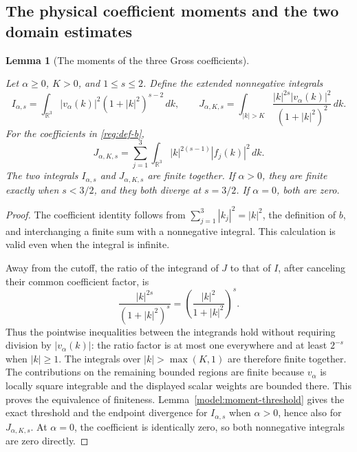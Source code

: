 \documentclass[11pt,a4paper]{article}
\newtheorem{lemma}[theorem]{Lemma}
\theoremstyle{definition}
\theoremstyle{remark}
\newcommand{\proofid}[1]{\par\smallskip{\normalfont\scriptsize\color{inkblue}Stable ID: \nolinkurl{#1}}\par\smallskip}
\begin{document}
\subsection{The physical coefficient moments and the two domain estimates}

\begin{lemma}[The moments of the three Gross coefficients]
\label{reg:moment-equivalence}
\proofid{reg:moment-equivalence}
\par{}\par\smallskip

Let \(\alpha\geq0\), \(K>0\), and \(1\leq s\leq2\). Define the
extended nonnegative integrals
\[
 I_{\alpha,s}=\int_{\mathbb R^3}|v_\alpha(k)|^2(1+|k|^2)^{s-2}\,dk,
 \qquad
 J_{\alpha,K,s}=\int_{|k|>K}
             \frac{|k|^{2s}|v_\alpha(k)|^2}{(1+|k|^2)^2}\,dk.
\]
For the coefficients in \eqref{reg:def-b},
\[
 J_{\alpha,K,s}
   =\sum_{j=1}^3\int_{\mathbb R^3}|k|^{2(s-1)}|f_j(k)|^2\,dk.
\]
The two integrals \(I_{\alpha,s}\) and \(J_{\alpha,K,s}\) are finite
together. If \(\alpha>0\), they are finite exactly when \(s<3/2\),
and they both diverge at \(s=3/2\). If \(\alpha=0\), both are zero.
\end{lemma}
\begin{proof}
The coefficient identity follows from
\(\sum_{j=1}^3|k_j|^2=|k|^2\), the definition of \(b\), and
interchanging a finite sum with a nonnegative integral. This calculation
is valid even when the integral is infinite.

Away from the cutoff, the ratio of the integrand of \(J\) to that of
\(I\), after canceling their common coefficient factor, is
\[
 \frac{|k|^{2s}}{(1+|k|^2)^s}
 =\left(\frac{|k|^2}{1+|k|^2}\right)^s.
\]
Thus the pointwise inequalities between the integrands hold without
requiring division by \(|v_\alpha(k)|\): the ratio factor is at most
one everywhere and at least \(2^{-s}\) when \(|k|\geq1\).
The integrals over \(|k|>\max(K,1)\) are therefore finite together.
The contributions on the remaining bounded regions are finite because
\(v_\alpha\) is locally square integrable and the displayed scalar
weights are bounded there. This proves the equivalence of finiteness.
Lemma~\ref{model:moment-threshold} gives the exact threshold and the
endpoint divergence for \(I_{\alpha,s}\) when \(\alpha>0\), hence
also for \(J_{\alpha,K,s}\). At \(\alpha=0\), the coefficient is
identically zero, so both nonnegative integrals are zero directly.
\end{proof}
\end{document}
